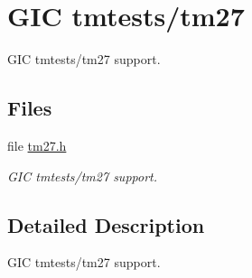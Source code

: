 \hypertarget{group__realview-pbx-a9__tm27}{}\section{G\+IC tmtests/tm27}
\label{group__realview-pbx-a9__tm27}


G\+IC tmtests/tm27 support.  


\subsection*{Files}
\begin{DoxyCompactItemize}
\item 
file \mbox{\hyperlink{arm_2realview-pbx-a9_2include_2tm27_8h}{tm27.\+h}}
\begin{DoxyCompactList}\small\item\em G\+IC tmtests/tm27 support. \end{DoxyCompactList}\end{DoxyCompactItemize}


\subsection{Detailed Description}
G\+IC tmtests/tm27 support. 

